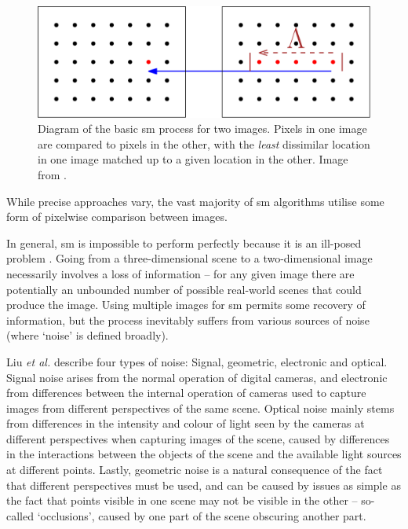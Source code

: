 \begin{figure}
    \centering
    \includegraphics[width=1.0\textwidth]{chapters/litreview/images/stereo_matching-eps-converted-to.pdf}
    \caption{Diagram of the basic \gls{sm} process for two images.  Pixels in one image are compared to pixels in the other, with the \emph{least} dissimilar location in one image matched up to a given location in the other.  Image from \cite{bsmpcvpic}.}
    \label{fig:stereomatchingbasic}
\end{figure}

While precise approaches vary, the vast majority of \gls{sm} algorithms utilise some form of pixelwise comparison between images.  



In general, \gls{sm} is impossible to perform perfectly because it is an ill-posed problem \fxnote[inline]{[ref]}.  Going from a three-dimensional scene to a two-dimensional image necessarily involves a loss of information -- for any given image there are potentially an unbounded number of possible real-world scenes that could produce the image.  Using multiple images for \gls{sm} permits some recovery of information, but the process inevitably suffers from various sources of noise (where `noise' is defined broadly).

Liu \textit{et al.} \cite{Liu2005} describe four types of noise:  Signal, geometric, electronic and optical.  Signal noise arises from the normal operation of digital cameras, and electronic from differences between the internal operation of cameras used to capture images from different perspectives of the same scene.  Optical noise mainly stems from differences in the intensity and colour of light seen by the cameras at different perspectives when capturing images of the scene, caused by differences in the interactions between the objects of the scene and the available light sources at different points.  Lastly, geometric noise is a natural consequence of the fact that different perspectives must be used, and can be caused by issues as simple as the fact that points visible in one scene may not be visible in the other -- so-called `occlusions', caused by one part of the scene obscuring another part.

